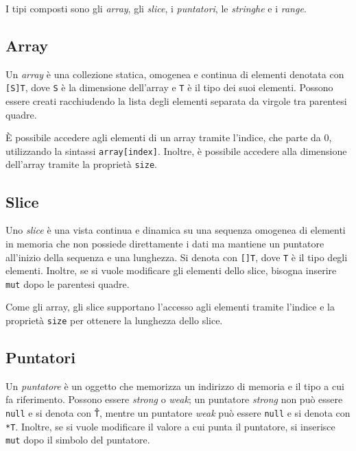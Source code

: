 I tipi composti sono gli \emph{array}, gli \emph{slice}, i \emph{puntatori}, le \emph{stringhe} e i \emph{range}.

\subsection{Array}
\label{ssec:array}

Un \emph{array} \`e una collezione statica, omogenea e continua di elementi denotata con \texttt{[S]T}, dove \texttt{S} \`e la dimensione dell'array e \texttt{T} \`e il tipo dei suoi elementi. Possono essere creati racchiudendo la lista degli elementi separata da virgole tra parentesi quadre.

\`E possibile accedere agli elementi di un array tramite l'indice, che parte da 0, utilizzando la sintassi \texttt{array[index]}. Inoltre, \`e possibile accedere alla dimensione dell'array tramite la propriet\`a \texttt{size}.

\subsection{Slice}
\label{ssec:slice}

Uno \emph{slice} \`e una vista continua e dinamica su una sequenza omogenea di elementi in memoria che non possiede direttamente i dati ma mantiene un puntatore all'inizio della sequenza e una lunghezza. Si denota con \texttt{[]T}, dove \texttt{T} \`e il tipo degli elementi. Inoltre, se si vuole modificare gli elementi dello slice, bisogna inserire \texttt{mut} dopo le parentesi quadre.

Come gli array, gli slice supportano l'accesso agli elementi tramite l'indice e la propriet\`a \texttt{size} per ottenere la lunghezza dello slice.

\subsection{Puntatori}
\label{ssec:puntatori}

Un \emph{puntatore} \`e un oggetto che memorizza un indirizzo di memoria e il tipo a cui fa riferimento. Possono essere \textit{strong} o \textit{weak}; un puntatore \textit{strong} non pu\`o essere \texttt{null} e si denota con \texttt{\^T}, mentre un puntatore \textit{weak} pu\`o essere \texttt{null} e si denota con \texttt{*T}. Inoltre, se si vuole modificare il valore a cui punta il puntatore, si inserisce \texttt{mut} dopo il simbolo del puntatore.

